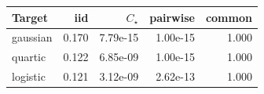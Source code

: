 \begin{tabular}{lrrrr}
\toprule
Target & iid & $C_\star$ & pairwise & common \\
\midrule
gaussian & 0.170 & 7.79e-15 & 1.00e-15 & 1.000 \\
quartic & 0.122 & 6.85e-09 & 1.00e-15 & 1.000 \\
logistic & 0.121 & 3.12e-09 & 2.62e-13 & 1.000 \\
\bottomrule
\end{tabular}

